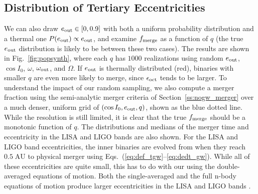 \documentclass[
        fleqn,
        usenatbib,
    ]{mnras}
\begin{document}
\subsection{Distribution of Tertiary Eccentricities}

We can also draw $e_{\rm out} \in [0, 0.9]$ with both a uniform probability
distribution and a thermal one $P(e_{\rm out}) \propto e_{\rm out}$, and examine
$f_{\rm merge}$ as a function of $q$ (the true $e_{\rm out}$ distribution is
likely to be between these two cases). The results are shown in
Fig.~\ref{fig:popsynth}, where each $q$ has $1000$ realizations using random
$e_{\rm out}$, $\cos I_0$, $\omega$, $\omega_{\rm out}$, and $\Omega$. If
$e_{\rm out}$ is thermally distributed (red), binaries with smaller $q$ are even
more likely to merge, since $\epsilon_{\rm oct}$ tends to be larger. To
understand the impact of our random sampling, we also compute a merger fraction
using the semi-analytic merger criteria of Section~\ref{ss:nogw_merger} over a
much denser, uniform grid of $(\cos I_0, e_{\rm out}, q)$, shown as the blue
dotted line. While the resolution is still limited, it is clear that the true
$f_{\rm merge}$ should be a monotonic function of $q$. The distributions and
medians of the merger time and eccentricity in the LISA and LIGO bands are also
shown. For the LISA and LIGO band eccentricities, the inner binaries are evolved
from when they reach $0.5\;\mathrm{AU}$ to physical merger using
Eqs.~(\ref{eq:def_tgw}--\ref{eq:dedt_gw}). While all of these eccentricities are
quite small, this has to do with our using the double-averaged equations of
motion. Both the single-averaged and the full n-body equations of motion produce
larger eccentricities in the LISA and LIGO bands \citep{LL19}.
\end{document}
